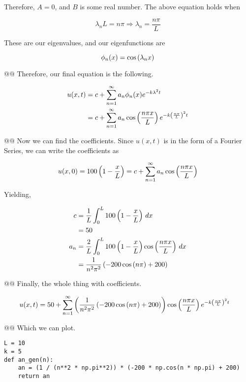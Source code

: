 \documentclass[10pt]{article}
\begin{document}
\begin{easylist}[enumerate]
    Therefore, $A = 0$, and $B$ is some real number. The above equation holds when

    \[
        \lambda_n L = n \pi \Rightarrow \lambda_n = \frac{n \pi}{L}
    \]

    These are our eigenvalues, and our eigenfunctions are

    \[
        \phi_n(x) = \cos\left( \lambda_n x \right)
    \]

    @@ Therefore, our final equation is the following.

    \begin{align*}
        u(x, t) &= c + \sum_{n = 1}^\infty a_n \phi_n(x) e^{-k\lambda^2t}\\
        &= c + \sum_{n = 1}^\infty a_n \cos\left( \frac{n\pi x}{L} \right) e^{-k{\left( \frac{n \pi}{L} \right)}^2t}
    \end{align*}

    @@ Now we can find the coefficients. Since $u(x, t)$ is in the form of a Fourier Series, we can write the
    coefficients as

    \begin{align*}
        u(x, 0) = 100 \left( 1 - \frac{x}{L} \right) = c + \sum_{n = 1}^\infty a_n \cos\left( \frac{n\pi x}{L} \right)\\
    \end{align*}

    Yielding,

    \begin{align*}
        c &= \frac{1}{L} \int_0^L 100 \left( 1 - \frac{x}{L} \right) \, dx\\
        &= 50\\
        a_n &= \frac{2}{L} \int_0^L 100 \left( 1 - \frac{x}{L} \right) \cos\left( \frac{n\pi x}{L} \right) \, dx\\
        &= \frac{1}{n^{2} \pi^{2}} \left(- 200 \cos{\left (n \pi \right )} + 200\right)
    \end{align*}

    @@ Finally, the whole thing with coefficients.

    \begin{align*}
        u(x, t) &= 50 + \sum_{n = 1}^\infty \left( \frac{1}{n^{2} \pi^{2}} \left(- 200 \cos{\left (n \pi \right )} + 200\right) \right) \cos\left( \frac{n\pi x}{L} \right) e^{-k{\left( \frac{n \pi}{L} \right)}^2t}
    \end{align*}

    @@ Which we can plot.

\weave

\begin{verbatim}
L = 10
k = 5
def an_gen(n):
    an = (1 / (n**2 * np.pi**2)) * (-200 * np.cos(n * np.pi) + 200)
    return an


\end{verbatim}
\end{easylist}
\end{document}
